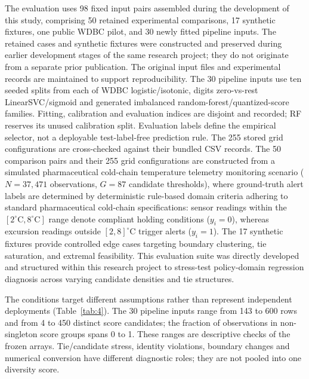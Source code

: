 \documentclass[11pt,a4paper]{article}
\begin{document}
The evaluation uses 98 fixed input pairs assembled during the development of this study, comprising 50 retained experimental comparisons, 17 synthetic fixtures, one public WDBC pilot, and 30 newly fitted pipeline inputs. The retained cases and synthetic fixtures were constructed and preserved during earlier development stages of the same research project; they do not originate from a separate prior publication. The original input files and experimental records are maintained to support reproducibility. The 30 pipeline inputs use ten seeded splits from each of WDBC logistic/isotonic, digits zero-vs-rest LinearSVC/sigmoid and generated imbalanced random-forest/quantized-score families. Fitting, calibration and evaluation indices are disjoint and recorded; RF reserves its unused calibration split. Evaluation labels define the empirical selector, not a deployable test-label-free prediction rule. The 255 stored grid configurations are cross-checked against their bundled CSV records. The 50 comparison pairs and their 255 grid configurations are constructed from a simulated pharmaceutical cold-chain temperature telemetry monitoring scenario ($N=37{,}471$ observations, $G=87$ candidate thresholds), where ground-truth alert labels are determined by deterministic rule-based domain criteria adhering to standard pharmaceutical cold-chain specifications: sensor readings within the $[2^\circ\text{C}, 8^\circ\text{C}]$ range denote compliant holding conditions ($y_i=0$), whereas excursion readings outside $[2, 8]^\circ\text{C}$ trigger alerts ($y_i=1$). The 17 synthetic fixtures provide controlled edge cases targeting boundary clustering, tie saturation, and extremal feasibility. This evaluation suite was directly developed and structured within this research project to stress-test policy-domain regression diagnosis across varying candidate densities and tie structures.

The conditions target different assumptions rather than represent independent deployments (Table~\ref{tab:4}). The 30 pipeline inputs range from 143 to 600 rows and from 4 to 450 distinct score candidates; the fraction of observations in non-singleton score groups spans 0 to 1. These ranges are descriptive checks of the frozen arrays. Tie/candidate stress, identity violations, boundary changes and numerical conversion have different diagnostic roles; they are not pooled into one diversity score.
\end{document}
